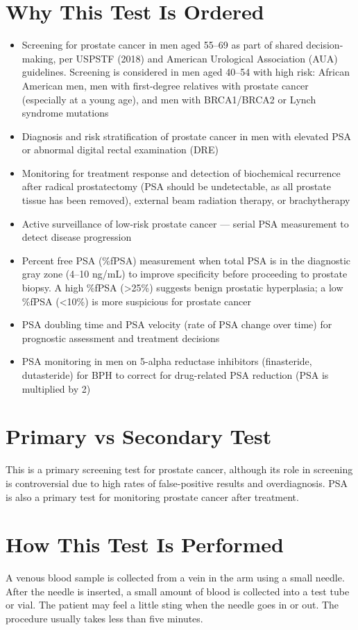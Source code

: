 \section*{Why This Test Is Ordered}
\begin{itemize}
  \item Screening for prostate cancer in men aged 55--69 as part of shared decision-making, per USPSTF (2018) and American Urological Association (AUA) guidelines. Screening is considered in men aged 40--54 with high risk: African American men, men with first-degree relatives with prostate cancer (especially at a young age), and men with BRCA1/BRCA2 or Lynch syndrome mutations
  \item Diagnosis and risk stratification of prostate cancer in men with elevated PSA or abnormal digital rectal examination (DRE)
  \item Monitoring for treatment response and detection of biochemical recurrence after radical prostatectomy (PSA should be undetectable, as all prostate tissue has been removed), external beam radiation therapy, or brachytherapy
  \item Active surveillance of low-risk prostate cancer --- serial PSA measurement to detect disease progression
  \item Percent free PSA (\%fPSA) measurement when total PSA is in the diagnostic gray zone (4--10 ng/mL) to improve specificity before proceeding to prostate biopsy. A high \%fPSA (>25\%) suggests benign prostatic hyperplasia; a low \%fPSA (<10\%) is more suspicious for prostate cancer \cite{catalona1998percentage}
  \item PSA doubling time and PSA velocity (rate of PSA change over time) for prognostic assessment and treatment decisions
  \item PSA monitoring in men on 5-alpha reductase inhibitors (finasteride, dutasteride) for BPH to correct for drug-related PSA reduction (PSA is multiplied by 2)
\end{itemize}

\section*{Primary vs Secondary Test}
This is a primary screening test for prostate cancer, although its role in screening is controversial due to high rates of false-positive results and overdiagnosis. PSA is also a primary test for monitoring prostate cancer after treatment.

\section*{How This Test Is Performed}
A venous blood sample is collected from a vein in the arm using a small needle. After the needle is inserted, a small amount of blood is collected into a test tube or vial. The patient may feel a little sting when the needle goes in or out. The procedure usually takes less than five minutes.

